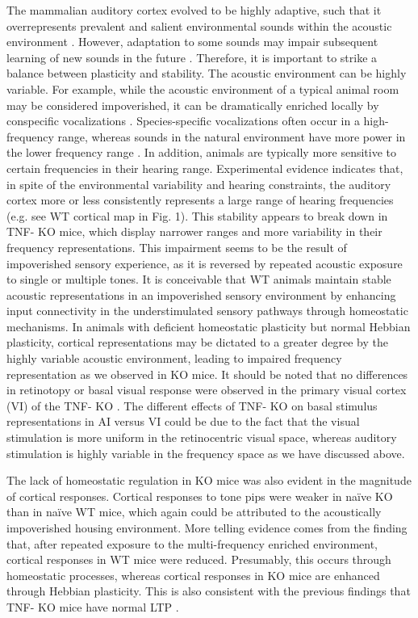 The mammalian auditory cortex evolved to be highly adaptive, such that it overrepresents prevalent and salient environmental sounds within the acoustic environment \cite{Diamond1986, Gonzalez-Lima1986, Ohl1996, Pantev1998, Edeline1998, Gao2000, Zhang2001, Syka2002, Fritz2003, Mrsic-Flogel2003, Dean2005, Popescu2010a, Cohen2011, Takahashi2011}. However, adaptation to some sounds may impair subsequent learning of new sounds in the future \cite{Sarro2011}. Therefore, it is important to strike a balance between plasticity and stability. The acoustic environment can be highly variable. For example, while the acoustic environment of a typical animal room may be considered impoverished, it can be dramatically enriched locally by conspecific vocalizations \cite{Kim2009, Grimsley2011}. Species-specific vocalizations often occur in a high-frequency range, whereas sounds in the natural environment have more power in the lower frequency range \cite{Liu2003, Kim2009}. In addition, animals are typically more sensitive to certain frequencies in their hearing range. Experimental evidence indicates that, in spite of the environmental variability and hearing constraints, the auditory cortex more or less consistently represents a large range of hearing frequencies (e.g. see WT cortical map in Fig. 1). This stability appears to break down in TNF-\textalpha{} KO mice, which display narrower ranges and more variability in their frequency representations. This impairment seems to be the result of impoverished sensory experience, as it is reversed by repeated acoustic exposure to single or multiple tones. It is conceivable that WT animals maintain stable acoustic representations in an impoverished sensory environment by enhancing input connectivity in the understimulated sensory pathways through homeostatic mechanisms. In animals with deficient homeostatic plasticity but normal Hebbian plasticity, cortical representations may be dictated to a greater degree by the highly variable acoustic environment, leading to impaired frequency representation as we observed in KO mice. It should be noted that no differences in retinotopy or basal visual response were observed in the primary visual cortex (VI) of the TNF-\textalpha{} KO \cite{Kaneko2008}. The different effects of TNF-\textalpha{} KO on basal stimulus representations in AI versus VI could be due to the fact that the visual stimulation is more uniform in the retinocentric visual space, whereas auditory stimulation is highly variable in the frequency space as we have discussed above.

The lack of homeostatic regulation in KO mice was also evident in the magnitude of cortical responses. Cortical responses to tone pips were weaker in na\"ive KO than in na\"ive WT mice, which again could be attributed to the acoustically impoverished housing environment. More telling evidence comes from the finding that, after repeated exposure to the multi-frequency enriched environment, cortical responses in WT mice were reduced. Presumably, this occurs through homeostatic processes, whereas cortical responses in KO mice are enhanced through Hebbian plasticity. This is also consistent with the previous findings that TNF-\textalpha{} KO mice have normal LTP \cite{Albensi2000, Stellwagen2006, Kaneko2008}.

